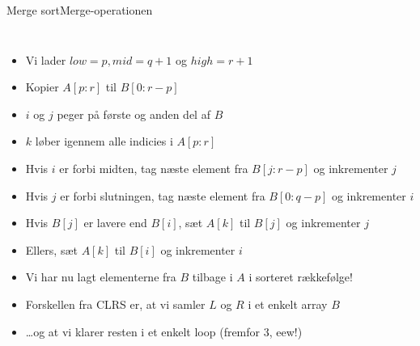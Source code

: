 \documentclass[aspectratio=1610]{beamer}
\begin{document}
\begin{frame}{Merge sort}{Merge-operationen}
\begin{columns}
        \pause

        \begin{itemize}[<+->]
            \scriptsize
            \item Vi lader $low = p, mid = q+1$ og $high = r+1$
            \item Kopier $A[p:r]$ til $B[0:r-p]$
            \item $i$ og $j$ peger på første og anden del af $B$
            \item $k$ løber igennem alle indicies i $A[p:r]$
            \item Hvis $i$ er forbi midten, tag næste element fra $B[j:r-p]$ og
                inkrementer $j$
            \item Hvis $j$ er forbi slutningen, tag næste element fra $B[0:q-p]$
                og inkrementer $i$
            \item Hvis $B[j]$ er lavere end $B[i]$, sæt $A[k]$ til $B[j]$ og
                inkrementer $j$
            \item Ellers, sæt $A[k]$ til $B[i]$ og inkrementer $i$
            \item Vi har nu lagt elementerne fra $B$ tilbage i $A$ i sorteret
                rækkefølge!
            \item Forskellen fra CLRS er, at vi samler $L$ og $R$ i et enkelt
                array $B$
            \item \ldots og at vi klarer resten i et enkelt loop (fremfor 3,
                eew!)
        \end{itemize}
    \end{columns}

\end{frame}
\end{document}
